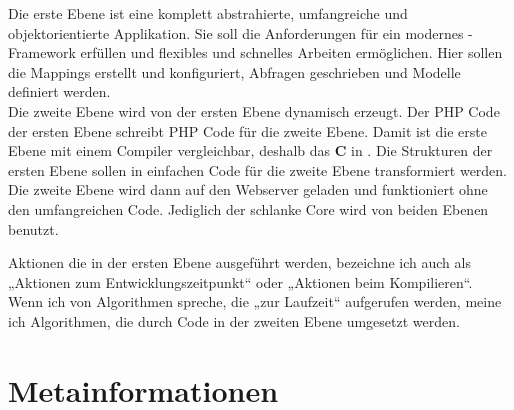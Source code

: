 Die erste Ebene ist eine komplett abstrahierte, umfangreiche und objektorientierte Applikation. Sie soll die Anforderungen für ein modernes \ORM-Framework erfüllen und flexibles und schnelles Arbeiten ermöglichen. Hier sollen die Mappings erstellt und konfiguriert, Abfragen geschrieben und Modelle definiert werden. \\
Die zweite Ebene wird von der ersten Ebene dynamisch erzeugt. Der PHP Code der ersten Ebene schreibt PHP Code für die zweite Ebene. Damit ist die erste Ebene mit einem Compiler vergleichbar, deshalb das \textbf{C} in \PSCORM. Die Strukturen der ersten Ebene sollen in einfachen Code für die zweite Ebene transformiert werden. Die zweite Ebene wird dann auf den Webserver geladen und funktioniert ohne den umfangreichen Code. Jediglich der schlanke Core wird von beiden Ebenen benutzt.\\

\begin{anmerkung}
Aktionen die in der ersten Ebene ausgeführt werden, bezeichne ich auch als „Aktionen zum Entwicklungszeitpunkt“ oder „Aktionen beim Kompilieren“. \\
Wenn ich von Algorithmen spreche, die „zur Laufzeit“ aufgerufen werden, meine ich Algorithmen, die durch Code in der zweiten Ebene umgesetzt werden.
\end{anmerkung}

\section{Metainformationen}

